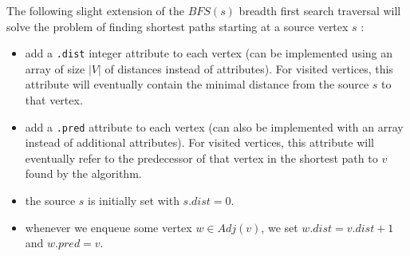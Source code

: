 \documentclass[12pt]{article}
\theoremstyle{plain}
\theoremstyle{remark}
\begin{document}
The following slight extension of the $BFS(s)$ breadth first search traversal 
will solve the problem of finding shortest paths starting at a source vertex $s$ :
\begin{itemize}
	\item add a {\tt .dist} integer attribute to each vertex (can be
		implemented using an array of size $|V|$ of distances instead of
		attributes). 
		For visited vertices, this attribute will eventually 
		contain the minimal distance from the source $s$ to that vertex.
	\item add a {\tt .pred} attribute to each vertex (can also be
		implemented with an array instead of additional attributes). For
		visited vertices, this attribute will eventually refer to the
		predecessor of that vertex in the shortest path to $v$ found by
		the algorithm.
	\item the source $s$ is initially set with $s.dist = 0$.  
	\item whenever we enqueue some vertex $w \in Adj(v)$, we set $w.dist =
		v.dist + 1$ and $w.pred = v.$
\end{itemize}
\end{document}
